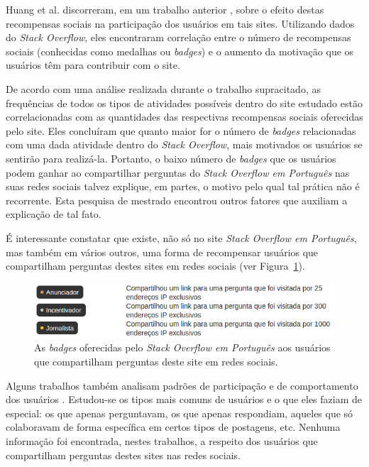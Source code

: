 Huang et al. discorreram, em um trabalho anterior \cite{li2012quantifying}, sobre o efeito destas recompensas sociais na participação dos usuários em tais sites. Utilizando dados do \textit{Stack Overflow}, eles encontraram correlação entre o número de recompensas sociais (conhecidas como medalhas ou \textit{badges}) e o aumento da motivação que os usuários têm para contribuir com o site. 

De acordo com uma análise realizada durante o trabalho supracitado, as frequências de todos os tipos de atividades possíveis dentro do site estudado estão correlacionadas com as quantidades das respectivas recompensas sociais oferecidas pelo site. Eles concluíram que quanto maior for o número de \textit{badges} relacionadas com uma dada atividade dentro do \textit{Stack Overflow}, mais motivados os usuários se sentirão para realizá-la. Portanto, o baixo número de \textit{badges} que os usuários podem ganhar ao compartilhar perguntas do \textit{Stack Overflow em Português} nas suas redes sociais talvez explique, em partes, o motivo pelo qual tal prática não é recorrente. Esta pesquisa de mestrado encontrou outros fatores que auxiliam a explicação de tal fato.

É interessante constatar que existe, não só no site \textit{Stack Overflow em Português}, mas também em vários outros, uma forma de recompensar usuários que compartilham perguntas destes sites em redes sociais (ver Figura~\ref{fig:medalhassopt}).

    \begin{figure}[H]
        \center
        \includegraphics[scale=.5]{./figuras/medalhas-compartilhar-sopt.png}
        \caption{As \textit{badges} oferecidas pelo \textit{Stack Overflow em Português} aos usuários que compartilham perguntas deste site em redes sociais.}
        \label{fig:medalhassopt}
    \end{figure}

Alguns trabalhos também analisam padrões de participação e de comportamento dos usuários \cite{adamic2008knowledge,furtado2013contributor,bian2008few}. Estudou-se os tipos mais comuns de usuários e o que eles faziam de especial: os que apenas perguntavam, os que apenas respondiam, aqueles que só colaboravam de forma específica em certos tipos de postagens, etc. Nenhuma informação foi encontrada, nestes trabalhos, a respeito dos usuários que compartilham perguntas destes sites nas redes sociais.

